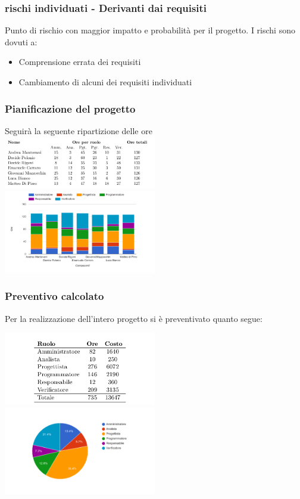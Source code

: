 \begin{frame}
  \frametitle{rischi individuati - Derivanti dai requisiti}
    Punto di rischio con maggior impatto e probabilità per il progetto.
    I rischi sono dovuti a:
    \begin{itemize}
    \item Comprensione errata dei requisiti
    \item Cambiamento di alcuni dei requisiti individuati
    \end{itemize}    
\end{frame}

\begin{frame}
  \frametitle{Pianificazione del progetto}
  Seguirà la seguente ripartizione delle ore
  \includegraphics[width=0.5\textwidth]{res/img/RipartizioneOre.png}
  \includegraphics[width=0.5\textwidth]{res/img/RipOreGrafico.png}

\end{frame}

\begin{frame}
  \frametitle{Preventivo calcolato}
  Per la realizzazione dell'intero progetto si è preventivato quanto segue:

  \includegraphics[width=0.5\textwidth]{res/img/TabCosti.png}
  \includegraphics[width=0.5\textwidth]{res/img/CostoRipartizione.png}
\end{frame}


